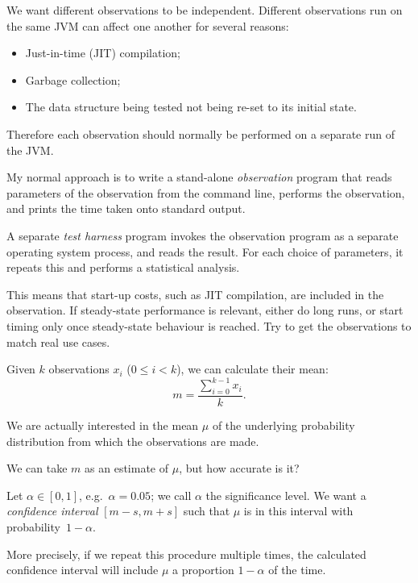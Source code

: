 \begin{slide}

We want different observations to be independent.  Different observations run
on the same JVM can affect one another for several reasons:
%
\begin{itemize}
\item
Just-in-time (JIT) compilation;

\item
Garbage collection;


\item
The data structure being tested not being re-set to its initial state.
\end{itemize}
%
Therefore each observation should normally be performed on a separate run of
the JVM.
\end{slide}


\begin{slide}

My normal approach is to write a stand-alone \emph{observation} program that
reads parameters of the observation from the command line, performs the
observation, and prints the time taken onto standard output.

A separate \emph{test harness} program invokes the observation program as a
separate operating system process, and reads the result.  For each choice of
parameters, it repeats this and performs a statistical analysis.

This means that start-up costs, such as JIT compilation, are included in the
observation.  If steady-state performance is relevant, either do long runs, or
start timing only once steady-state behaviour is reached.  Try to get the
observations to match real use cases.
\end{slide}


\begin{slide}

Given $k$ observations $x_i$ ($0 \le i < k$), we can calculate their mean:
\[
m = \frac{\sum_{i = 0}^{k-1} x_i}{k}.
\]

We are actually interested in the mean $\mu$ of the underlying probability
distribution from which the observations are made. 

We can take $m$ as an estimate of $\mu$, but how accurate is it?

Let $\alpha \in [0,1]$, e.g.\ $\alpha = 0.05$; we call $\alpha$ the
significance level.  We want a \emph{confidence interval} $[m-s, m+s]$ such
that $\mu$ is in this interval with probability~$1-\alpha$.

More precisely, if we repeat this procedure multiple times, the calculated
confidence interval will include $\mu$ a proportion $1-\alpha$ of the time. 
\end{slide}

